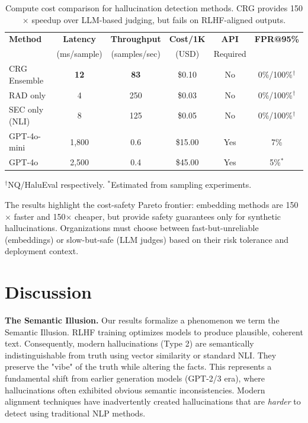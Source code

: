 \documentclass[11pt]{article}
\begin{document}
\begin{table}[htbp]
\centering
\caption{Compute cost comparison for hallucination detection methods. CRG provides 150$\times$ speedup over LLM-based judging, but fails on RLHF-aligned outputs.}
\label{tab:cost}
\begin{tabular}{lccccc}
\toprule
\textbf{Method} & \textbf{Latency} & \textbf{Throughput} & \textbf{Cost/1K} & \textbf{API} & \textbf{FPR@95\%} \\
 & (ms/sample) & (samples/sec) & (USD) & Required & \\
\midrule
CRG Ensemble & \textbf{12} & \textbf{83} & \$0.10 & No & 0\%/100\%$^\dagger$ \\
RAD only & 4 & 250 & \$0.03 & No & 0\%/100\%$^\dagger$ \\
SEC only (NLI) & 8 & 125 & \$0.05 & No & 0\%/100\%$^\dagger$ \\
\midrule
GPT-4o-mini & 1,800 & 0.6 & \$15.00 & Yes & 7\% \\
GPT-4o & 2,500 & 0.4 & \$45.00 & Yes & 5\%$^*$ \\
\bottomrule
\end{tabular}
\footnotesize{$^\dagger$NQ/HaluEval respectively. $^*$Estimated from sampling experiments.}
\end{table}

The results highlight the cost-safety Pareto frontier: embedding methods are 150$\times$ faster and 150$\times$ cheaper, but provide safety guarantees only for synthetic hallucinations. Organizations must choose between fast-but-unreliable (embeddings) or slow-but-safe (LLM judges) based on their risk tolerance and deployment context.

\section{Discussion}

\textbf{The Semantic Illusion.} Our results formalize a phenomenon we term the Semantic Illusion. RLHF training optimizes models to produce plausible, coherent text. Consequently, modern hallucinations (Type 2) are semantically indistinguishable from truth using vector similarity or standard NLI. They preserve the "vibe" of the truth while altering the facts. This represents a fundamental shift from earlier generation models (GPT-2/3 era), where hallucinations often exhibited obvious semantic inconsistencies. Modern alignment techniques have inadvertently created hallucinations that are \textit{harder} to detect using traditional NLP methods.
\end{document}
